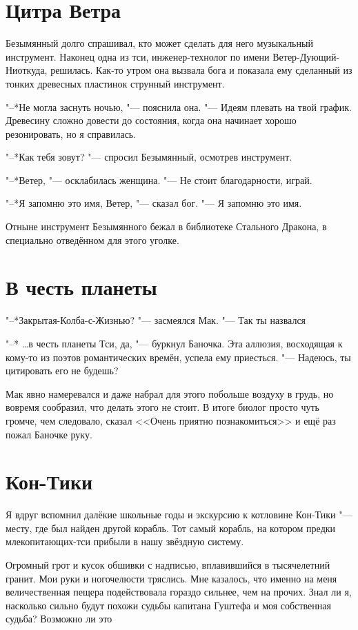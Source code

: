 \documentclass[a4paper,10pt,fleqn]{book}
\newcommand{\ldotst}{\so{...}\xspace}
\newcommand{\ldotsq}{\so{?\hbox{\hspace{-.212em}}..}\xspace}
\begin{document}
\section{Цитра Ветра}

Безымянный долго спрашивал, кто может сделать для него музыкальный инструмент.
Наконец одна из тси, инженер-технолог по имени Ветер-Дующий-Ниоткуда, решилась.
Как-то утром она вызвала бога и показала ему сделанный из тонких древесных пластинок струнный инструмент.

"--*Не могла заснуть ночью, "--- пояснила она.
"--- Идеям плевать на твой график.
Древесину сложно довести до состояния, когда она начинает хорошо резонировать, но я справилась.

"--*Как тебя зовут? "--- спросил Безымянный, осмотрев инструмент.

"--*Ветер, "--- осклабилась женщина.
"--- Не стоит благодарности, играй.

"--*Я запомню это имя, Ветер, "--- сказал бог.
"--- Я запомню это имя.

Отныне инструмент Безымянного бежал в библиотеке Стального Дракона, в специально отведённом для этого уголке.

\section{В честь планеты}

"--*Закрытая-Колба-с-Жизнью? "--- засмеялся Мак.
"--- Так ты назвался\ldotst

"--* \dots в честь планеты Тси, да, "--- буркнул Баночка.
Эта аллюзия, восходящая к кому-то из поэтов романтических времён, успела ему приесться.
"--- Надеюсь, ты цитировать его не будешь?

Мак явно намеревался и даже набрал для этого побольше воздуху в грудь, но вовремя сообразил, что делать этого не стоит.
В итоге биолог просто чуть громче, чем следовало, сказал <<Очень приятно познакомиться>> и ещё раз пожал Баночке руку.

\section{Кон-Тики}

Я вдруг вспомнил далёкие школьные годы и экскурсию к котловине Кон-Тики "--- месту, где был найден другой корабль.
Тот самый корабль, на котором предки млекопитающих-тси прибыли в нашу звёздную систему.

Огромный грот и кусок обшивки с надписью, вплавившийся в тысячелетний гранит.
Мои руки и ногочелюсти тряслись.
Мне казалось, что именно на меня величественная пещера подействовала гораздо сильнее, чем на прочих.
Знал ли я, насколько сильно будут похожи судьбы капитана Гуштефа и моя собственная судьба?
Возможно ли это\ldotsq
\end{document}
